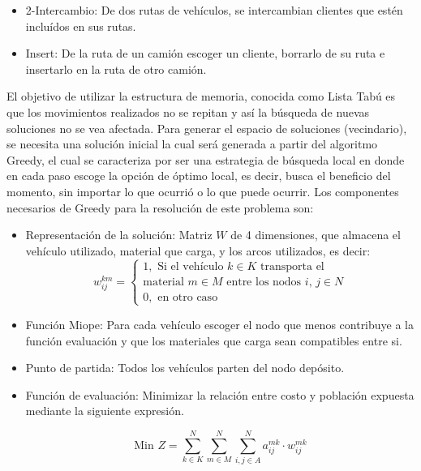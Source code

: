 \documentclass[conference]{IEEEtran}
\begin{document}
\begin{itemize}
    \item 2-Intercambio: De dos rutas de veh\'iculos, se intercambian clientes que est\'en inclu\'idos en sus rutas.
    
    \item Insert: De la ruta de un cami\'on escoger un cliente, borrarlo de su ruta e insertarlo en la ruta de otro cami\'on.
\end{itemize}

El objetivo de utilizar la estructura de memoria, conocida como Lista Tab\'u es que los movimientos realizados no se repitan y as\'i la b\'usqueda de nuevas soluciones no se vea afectada. Para generar el espacio de soluciones (vecindario), se necesita una soluci\'on inicial la cual ser\'a generada a partir del algoritmo Greedy, el cual se caracteriza por ser una estrategia de b\'usqueda local en donde en cada paso escoge la opci\'on de \'optimo local, es decir, busca el beneficio del momento, sin importar lo que ocurri\'o o lo que puede ocurrir. Los componentes necesarios de Greedy para la resoluci\'on de este problema son:

\begin{itemize}
    \item Representaci\'on de la soluci\'on: Matriz $W$ de 4 dimensiones, que almacena el veh\'iculo utilizado, material que carga, y los arcos utilizados, es decir:
   \\
   \begin{equation*}
        w^{km}_{ij} =     
    \begin{cases}
      1, \text{ Si el  veh\'iculo $k$} \in \text{$K$ transporta   el} \\  \text{material $m$} \in \text{$M$} \text{   entre los nodos $i$, $j$} \in \text{$N$}
      \\
      0, \text{ en otro caso}
    \end{cases}
    \end{equation*}
    \item Funci\'on Miope: Para cada veh\'iculo escoger el nodo que menos contribuye a la funci\'on evaluaci\'on y que los materiales que carga sean compatibles entre si.
    \item Punto de partida: Todos los veh\'iculos parten del nodo dep\'osito.
    \item Funci\'on de evaluaci\'on: Minimizar la relaci\'on entre costo y poblaci\'on expuesta mediante la siguiente expresi\'on.
    
    \begin{equation}
            \text{Min } Z = \sum_{k \in K}^N \sum_{m \in M}^N \sum_{i,j \in A}^N a^{mk}_{ij} \cdot w^{mk}_{ij}
    \end{equation}
\end{itemize}
\end{document}

